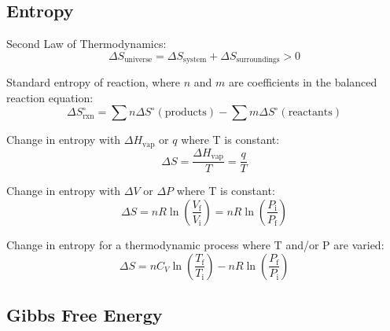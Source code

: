 \documentclass[10pt]{article}
\def\not{^\circ}
\begin{document}

\newpage
\subsection{Entropy}

Second Law of Thermodynamics:
\begin{equation*}
\Delta S_\textrm{universe} = \Delta S_\textrm{system} + \Delta S_\textrm{surroundings} > 0
\end{equation*}

Standard entropy of reaction, where $n$ and $m$ are coefficients in the balanced reaction equation:
\begin{equation*}
\Delta S\not_\textrm{rxn} = \sum{n\Delta S\not(\textrm{products})}-\sum{m\Delta S\not(\textrm{reactants})}
\end{equation*}

Change in entropy with $\Delta H_{\textrm{vap}}$ or $q$ where T is constant:
\begin{equation*}
\Delta S = \frac{\Delta H_{\textrm{vap}}}{T} = \frac{q}{T}
\end{equation*}

Change in entropy with $\Delta V$ or $\Delta P$ where T is constant:
\begin{equation*}
\Delta S = nR\ln \left(\frac{V_\textrm{f}}{V_\textrm{i}}\right) = nR\ln \left(\frac{P_\textrm{i}}{P_\textrm{f}}\right)
\end{equation*}

Change in entropy for a thermodynamic process where T and/or P are varied:
\begin{equation*}
\Delta S = nC_V\ln\left(\frac{T_\textrm{f}}{T_\textrm{i}}\right) - nR\ln\left(\frac{P_\textrm{f}}{P_\textrm{i}}\right)
\end{equation*}


\subsection{Gibbs Free Energy}
\end{document}
